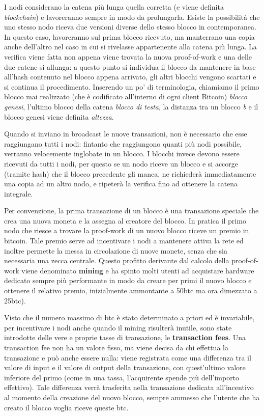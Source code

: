 I nodi considerano la catena più lunga quella corretta (e viene definita \emph{blockchain}) e lavoreranno sempre in modo da prolungarla. Esiste la possibilità che uno stesso nodo riceva due versioni diverse dello stesso blocco in contemporanea. In questo caso, lavoreranno sul prima blocco ricevuto, ma manterrano una copia anche dell'altro nel caso in cui si rivelasse appartenente alla catena più lunga. La verifica viene fatta non appena viene trovata la nuova proof-of-work e una delle due catene si allunga: a questo punto si individua il blocco da mantenere in base all'hash contenuto nel blocco appena arrivato, gli altri blocchi vengono scartati e si continua il procedimento. Inserendo un po' di terminologia, chiamiamo il primo blocco mai realizzato (che è codificato all'interno di ogni client Bitcoin) \emph{blocco genesi}, l'ultimo blocco della catena \emph{blocco di testa}, la distanza tra un blocco \emph{b} e il blocco genesi viene definita \emph{altezza}.

Quando si inviano in broadcast le nuove transazioni, non è necessario che esse raggiungano tutti i nodi: fintanto che raggiungono quanti più nodi possibile, verranno velocemente inglobate in un blocco. I blocchi invece devono essere ricevuti da tutti i nodi, per questo se un nodo riceve un blocco e si accorge (tramite hash) che il blocco precedente gli manca, ne richiederà immediatamente una copia ad un altro nodo, e ripeterà la verifica fino ad ottenere la catena integrale.

Per convenzione, la prima transazione di un blocco è una transazione speciale che crea una nuova moneta e la assegna al creatore del blocco. In pratica il primo nodo che riesce a trovare la proof-work di un nuovo blocco riceve un premio in bitcoin. Tale premio serve ad incentivare i nodi a mantenere attiva la rete ed inoltre permette la messa in circolazione di nuove monete, senza che sia necessaria una zecca centrale. Questo profitto derivante dal calcolo della proof-of-work viene denominato \textbf{mining} e ha spinto molti utenti ad acquistare hardware dedicato sempre più performante in modo da creare per primi il nuovo blocco e ottenere il relativo premio, inizialmente ammontante a 50btc ma ora dimezzato a 25btc).

Visto che il numero massimo di btc è stato determinato a priori ed è invariabile, per incentivare i nodi anche quando il mining risulterà inutile, sono state introdotte delle vere e proprie tasse di transazione, le \textbf{transaction fees}. Una transaction fee non ha un valore fisso, ma viene decisa da chi effettua la transazione e può anche essere nulla: viene registrata come una differenza tra il valore di input e il valore di output della transazione, con quest'ultimo valore inferiore del primo (come in una tassa, l'acquirente spende più dell'importo effettivo). Tale differenza verrà trasferita nella transazione dedicata all'incentivo al momento della creazione del nuovo blocco, sempre ammesso che l'utente che ha creato il blocco voglia riceve queste btc.

